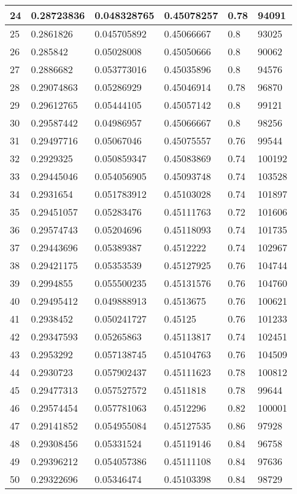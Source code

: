 \begin{longtable}{|l|l|l|l|l|l|}
24 & 0.28723836 & 0.048328765 & 0.45078257 & 0.78 & 94091 \\ \hline 
25 & 0.2861826 & 0.045705892 & 0.45066667 & 0.8 & 93025 \\ \hline 
26 & 0.285842 & 0.05028008 & 0.45050666 & 0.8 & 90062 \\ \hline 
27 & 0.2886682 & 0.053773016 & 0.45035896 & 0.8 & 94576 \\ \hline 
28 & 0.29074863 & 0.05286929 & 0.45046914 & 0.78 & 96870 \\ \hline 
29 & 0.29612765 & 0.05444105 & 0.45057142 & 0.8 & 99121 \\ \hline 
30 & 0.29587442 & 0.04986957 & 0.45066667 & 0.8 & 98256 \\ \hline 
31 & 0.29497716 & 0.05067046 & 0.45075557 & 0.76 & 99544 \\ \hline 
32 & 0.2929325 & 0.050859347 & 0.45083869 & 0.74 & 100192 \\ \hline 
33 & 0.29445046 & 0.054056905 & 0.45093748 & 0.74 & 103528 \\ \hline 
34 & 0.2931654 & 0.051783912 & 0.45103028 & 0.74 & 101897 \\ \hline 
35 & 0.29451057 & 0.05283476 & 0.45111763 & 0.72 & 101606 \\ \hline 
36 & 0.29574743 & 0.05204696 & 0.45118093 & 0.74 & 101735 \\ \hline 
37 & 0.29443696 & 0.05389387 & 0.4512222 & 0.74 & 102967 \\ \hline 
38 & 0.29421175 & 0.05353539 & 0.45127925 & 0.76 & 104744 \\ \hline 
39 & 0.2994855 & 0.055500235 & 0.45131576 & 0.76 & 104760 \\ \hline 
40 & 0.29495412 & 0.049888913 & 0.4513675 & 0.76 & 100621 \\ \hline 
41 & 0.2938452 & 0.050241727 & 0.45125 & 0.76 & 101233 \\ \hline 
42 & 0.29347593 & 0.05265863 & 0.45113817 & 0.74 & 102451 \\ \hline 
43 & 0.2953292 & 0.057138745 & 0.45104763 & 0.76 & 104509 \\ \hline 
44 & 0.2930723 & 0.057902437 & 0.45111623 & 0.78 & 100812 \\ \hline 
45 & 0.29477313 & 0.057527572 & 0.4511818 & 0.78 & 99644 \\ \hline 
46 & 0.29574454 & 0.057781063 & 0.4512296 & 0.82 & 100001 \\ \hline 
47 & 0.29141852 & 0.054955084 & 0.45127535 & 0.86 & 97928 \\ \hline 
48 & 0.29308456 & 0.05331524 & 0.45119146 & 0.84 & 96758 \\ \hline 
49 & 0.29396212 & 0.054057386 & 0.45111108 & 0.84 & 97636 \\ \hline 
50 & 0.29322696 & 0.05346474 & 0.45103398 & 0.84 & 98729 \\ \hline 
\end{longtable}